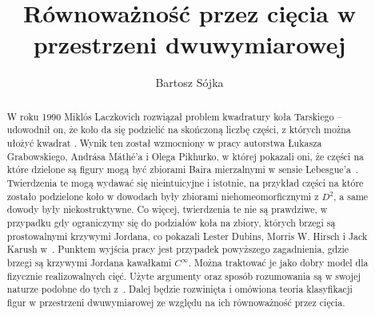 \documentclass[a4paper, 12pt, twosided]{article}
\title{Równoważność przez cięcia w przestrzeni dwuwymiarowej}
\author{Bartosz Sójka}
\begin{document}
\begin{abstract}
    W roku 1990 
    Miklós Laczkovich rozwiązał problem kwadratury koła Tarskiego -- 
    udowodnił
     on, że koło da się podzielić na skończoną liczbę części, z których można ułożyć kwadrat 
     \cite{Laczkovich1990}. Wynik ten został wzmocniony w pracy autorstwa 
     Łukasza Grabowskiego, Andrása Máthé'a i 
     Olega Pikhurko, w której pokazali oni, że części na które dzielone są figury mogą być zbiorami 
      Baira
     mierzalnymi w sensie Lebesgue'a~\cite{Grabowski}. 
     Twierdzenia te mogą 
     wydawać się nieintuicyjne i istotnie, na przykład części na które zostało podzielone 
      koło w 
     dowodach 
     były zbiorami 
     niehomeomorficznymi z $D^2$,
      a 
     same dowody
     były 
     niekostruktywne.
     Co więcej, twierdzenia te nie 
     są 
     prawdziwe, w przypadku
      gdy
     ograniczymy się do podziałów koła na zbiory, których brzegi są prostowalnymi krzywymi Jordana, 
     co pokazali Lester Dubins, Morris W. Hirsch i Jack Karush w~\cite{[DHK]}. 
      Punktem 
     wyjścia
     pracy jest przypadek powyższego zagadnienia, gdzie brzegi są krzywymi Jordana kawałkami 
     $C^\infty$.
     Można traktować je jako dobry model dla fizycznie realizowalnych cięć. 
     Użyte argumenty oraz sposób rozumowania są w swojej naturze podobne do 
     tych z~\cite{[DHK]}. Dalej będzie rozwinięta
      i
     omówiona teoria klasyfikacji figur w przestrzeni dwuwymiarowej ze względu na ich równoważność 
     przez
     cięcia.
 \end{abstract}
\end{document}
